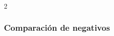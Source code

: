 {\begin{multicols}{2}
\begin{parts}
				
				
			\end{parts}
		\end{multicols}
	}


\subsubsection{Comparación de negativos}

